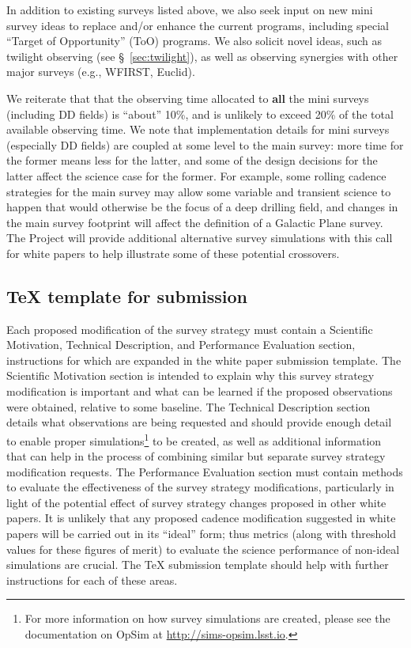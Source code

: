 \documentclass[DM,lsstdraft,toc,usenatbib]{lsstdoc}
\begin{document}
In addition to existing surveys listed above, we also seek input on new mini survey ideas 
to replace and/or enhance the current programs, including special ``Target of Opportunity'' (ToO) 
programs. We also solicit novel ideas, such as twilight observing (see \S~\ref{sec:twilight}),
as well as observing synergies with other major surveys (e.g., WFIRST, Euclid). 

We reiterate that that the observing time allocated to {\bf all} the mini surveys 
(including DD fields) is ``about'' 10\%, and is unlikely to exceed 20\% of the total available
observing time. We note that implementation details for mini surveys (especially DD fields)
are coupled at some level to the main survey: more time for the former means less 
for the latter, and some of the design decisions for the latter affect the science
case for the former.  For example, some rolling cadence strategies for the main survey  
may allow some variable and transient science to happen that would otherwise be the 
focus of a deep drilling field, and changes in the main survey footprint will affect the 
definition of a Galactic Plane survey. The Project will provide additional alternative 
survey simulations with this call for white papers to help illustrate some of these potential 
crossovers. 

\subsection{TeX template for submission \label{sec:textemplate}} 

Each proposed modification of the survey strategy must contain a Scientific Motivation, Technical Description, and Performance Evaluation section, instructions for which are expanded in the white paper submission template. The Scientific Motivation section is intended to explain why this survey strategy modification is important and what can be learned if the proposed observations were obtained, relative to some baseline. The Technical Description section details what observations are being requested and should provide enough detail to enable proper simulations\footnote{For more information on how survey simulations are created, please see the documentation on OpSim at \href{http://sims-opsim.lsst.io}{http://sims-opsim.lsst.io}.} to be created, as well as additional information that can help in the process of combining similar but separate survey strategy modification requests. The Performance Evaluation section must contain methods to evaluate the effectiveness of the survey strategy modifications, particularly in light of the potential effect of survey strategy changes proposed in other white papers. It is unlikely that any proposed cadence modification suggested in white papers will be carried out in its ``ideal'' form; thus metrics (along with threshold values for these figures of merit) to evaluate the science performance of non-ideal simulations are crucial. The TeX submission template should help with further instructions for each of these areas.
\end{document}
